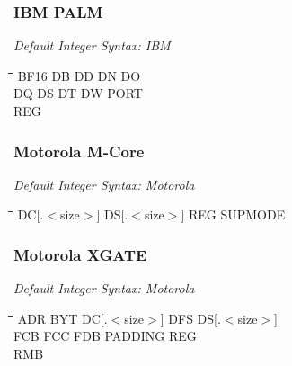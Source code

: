 \subsubsection{IBM PALM}

{\em Default Integer Syntax: IBM}

{\tt\begin{tabbing}
\hspace{3cm}\=\hspace{3cm}\=\hspace{3cm}\=\hspace{3cm}\=\kill
BF16       \> DB          \> DD          \> DN          \> DO \\
DQ         \> DS          \> DT          \> DW          \> PORT \\
REG \\
\end{tabbing}}

\subsubsection{Motorola M-Core}

{\em Default Integer Syntax: Motorola}

{\tt\begin{tabbing}
\hspace{3cm}\=\hspace{3cm}\=\hspace{3cm}\=\hspace{3cm}\=\kill
DC[.$<$size$>$] \> DS[.$<$size$>$] \> REG \> SUPMODE \\
\end{tabbing}}

\subsubsection{Motorola XGATE}

{\em Default Integer Syntax: Motorola}

{\tt\begin{tabbing}
\hspace{3cm}\=\hspace{3cm}\=\hspace{3cm}\=\hspace{3cm}\=\kill
ADR        \> BYT         \> DC[.$<$size$>$] \> DFS     \> DS[.$<$size$>$] \\
FCB        \> FCC         \> FDB         \> PADDING     \> REG \\
RMB \\
\end{tabbing}}


